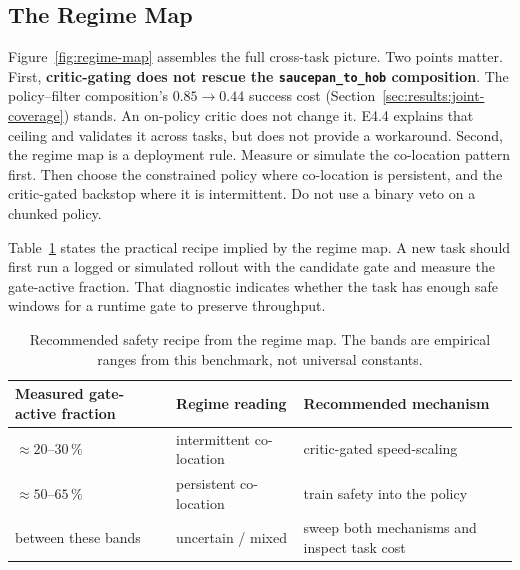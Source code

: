 \documentclass[11pt,a4paper]{report}
\begin{document}
\subsection{The Regime Map}

Figure~\ref{fig:regime-map} assembles the full cross-task picture. Two
points matter. First, \textbf{critic-gating does not rescue the
\texttt{saucepan\_to\_hob} composition}. The policy--filter composition's
$0.85 \to 0.44$ success cost (Section~\ref{sec:results:joint-coverage})
stands. An on-policy critic does not change it. E4.4 explains that
ceiling and validates it across tasks, but does not provide a
workaround. Second, the regime map is a deployment rule. Measure or
simulate the co-location pattern first. Then choose the constrained
policy where co-location is persistent, and the critic-gated backstop
where it is intermittent. Do not use a binary veto on a chunked policy.

Table~\ref{tab:recommended-recipes} states the practical recipe implied
by the regime map. A new task should first run a logged or simulated
rollout with the candidate gate and measure the gate-active fraction.
That diagnostic indicates whether the task has enough safe windows for
a runtime gate to preserve throughput.

\begin{table}[htbp]
\centering
\small
\caption{Recommended safety recipe from the regime map. The bands are
empirical ranges from this benchmark, not universal constants.}
\label{tab:recommended-recipes}
\begin{tabular}{lll}
\toprule
Measured gate-active fraction & Regime reading & Recommended mechanism \\
\midrule
$\approx 20$--$30\,\%$ & intermittent co-location & critic-gated speed-scaling \\
$\approx 50$--$65\,\%$ & persistent co-location & train safety into the policy \\
between these bands & uncertain / mixed & sweep both mechanisms and inspect task cost \\
\bottomrule
\end{tabular}
\end{table}
\end{document}
